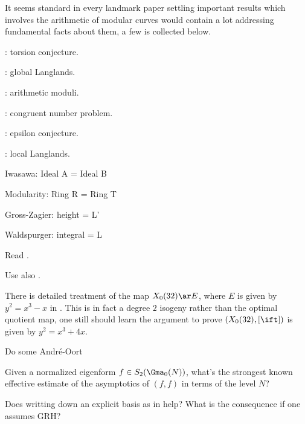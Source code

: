 \documentclass[article, a4paper, twoside]{universal}
\begin{document}
\confighead{}{}{}

It seems standard in every landmark paper settling important results which involves the arithmetic of modular curves would contain a lot addressing fundamental facts about them, a few is collected below.
\begin{itm}
	\item \cite{Mazur1977Eisenstein}: torsion conjecture.
	\item \cite{Deligne1971Formes,DS1974,Scholze2015}: global Langlands.
	\item \cite{DR1973,KM1985,Conrad2007}: arithmetic moduli.
	\item \cite{Tian2014,TYZ2017,BT2020Horizontal}: congruent number problem.
	\item \cite{Ribet1990}: epsilon conjecture.
	\item \cite{Scholze2011,Scholze2013LLC,Lurie2023}: local Langlands.
\end{itm}

\begin{cmt}
\begin{itm}
	\item Iwasawa: Ideal A = Ideal B
	\item Modularity: Ring R = Ring T
	\item Gross-Zagier: height = L'
	\item Waldspurger: integral = L
\end{itm}
\end{cmt}




Read \cite{CW1977,Gross1984,GZ1986,Kolyvagin1990}.

Use also \cite{CW2008}.

\begin{rmk}
	There is detailed treatment of the map $X_{0}(32)\ar E$, where $E$ is given by $y^{2}=x^{3}-x$ in \cite{Tian2014,TYZ2017}. This is in fact a degree $2$ isogeny rather than the optimal quotient map, one still should learn the argument to prove $(X_{0}(32),[\ift])$ is given by $y^{2}=x^{3}+4x$.
\end{rmk}



 Do some Andr{\'e}-Oort

\begin{qst}
	Given a normalized eigenform $f\in S_{2}(\Gma_{0}(N))$, what's the strongest known effective estimate of the asymptotics of $(f,f)$ in terms of the level $N$?

	Does writting down an explicit basis as in \cite{HPS1989Basis} help? What is the consequence if one assumes GRH?
\end{qst}
\end{document}
